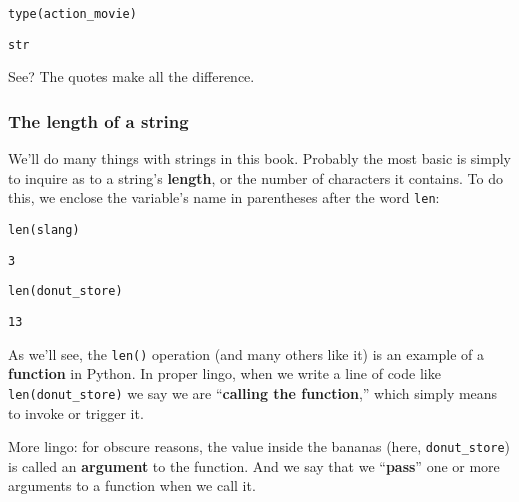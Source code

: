 \begin{Verbatim}[fontsize=\small,samepage=true,frame=single,framesep=3mm]
type(action_movie)
\end{Verbatim}
\vspace{-.15in}
\begin{Verbatim}[fontsize=\small,samepage=true,frame=leftline,framesep=5mm,framerule=1mm]
str
\end{Verbatim}

See? The quotes make all the difference.

\subsubsection{The length of a string}

We'll do many things with strings in this book. Probably the most basic is
simply to inquire as to a string's \textbf{length}, or the number of characters
it contains. To do this, we enclose the variable's name in parentheses after
the word \texttt{len}:

\begin{Verbatim}[fontsize=\small,samepage=true,frame=single,framesep=3mm]
len(slang)
\end{Verbatim}
\begin{Verbatim}[fontsize=\small,samepage=true,frame=leftline,framesep=5mm,framerule=1mm]
3
\end{Verbatim}

\begin{Verbatim}[fontsize=\small,samepage=true,frame=single,framesep=3mm]
len(donut_store)
\end{Verbatim}
\begin{Verbatim}[fontsize=\small,samepage=true,frame=leftline,framesep=5mm,framerule=1mm]
13
\end{Verbatim}

\label{function}
As we'll see, the \texttt{len()} operation (and many others like it) is an
example of a \textbf{function} in Python. In proper lingo, when we write a line
of code like \texttt{len(donut\_store)} we say we are ``\textbf{calling the
function},'' which simply means to invoke or trigger it.

More lingo: for obscure reasons, the value inside the bananas
(here, \texttt{donut\_store}) is called an \textbf{argument} to the
function. And we say that we ``\textbf{pass}'' one or more arguments to a
function when we call it.

